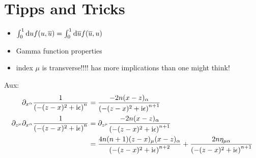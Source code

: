 \ifdefined\mainprogram{}
\else

\fi

\section{Tipps and Tricks}
\begin{itemize}
	\item $\int _0^1 \text{d} u  f(u,\overline u) = \int _0^1 \text{d} \overline u  f(\overline u, u)$
	\item Gamma function properties
	\item index $\mu$ is transverse!!!! has more implications than one might think!
\end{itemize}


Aux:
\begin{align}
	\partial_{x^\alpha} \frac{1}{ \left(-(z-x)^2+\text{i}\epsilon\right)^{n}}
	&=
	\frac{-2n(x-z)_\alpha}{ \left(-(z-x)^2+\text{i}\epsilon\right)^{n+1}}
	\\
	\partial_{z^\mu}\partial_{x^\alpha} \frac{1}{ \left(-(z-x)^2+\text{i}\epsilon\right)^{n}}
	&=
	\partial_{z^\mu}\frac{-2n(x-z)_\alpha}{ \left(-(z-x)^2+\text{i}\epsilon\right)^{n+1}}
	\\
	&=
	\frac{4n(n+1)(z-x)_\mu(x-z)_\alpha}{ \left(-(z-x)^2+\text{i}\epsilon\right)^{n+2}} + 
	\frac{2n\eta_{\mu\alpha}}{ \left(-(z-x)^2+\text{i}\epsilon\right)^{n+1}}
\end{align}

\ifdefined\mainprogram{}
\else

\fi